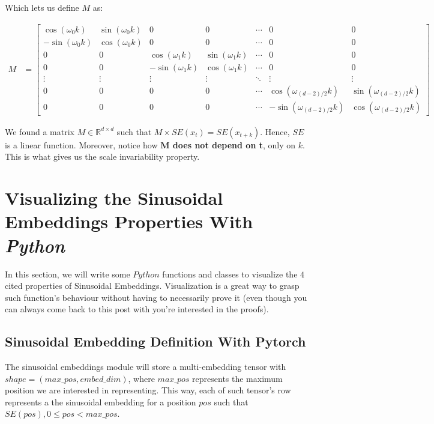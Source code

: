 \documentclass{article}
\begin{document}
Which lets us define $M$ as:

\begin{align}
	M &=
	\begin{bmatrix}
		\cos(\omega_0 k) & \sin(\omega_0 k) & 0 & 0 & \cdots & 0 & 0 \\
		-\sin(\omega_0 k) & \cos(\omega_0 k) & 0 & 0 & \cdots & 0 & 0 \\
		0 & 0 & \cos(\omega_1 k) & \sin(\omega_1 k) & \cdots & 0 & 0 \\
		0 & 0 & -\sin(\omega_1 k) & \cos(\omega_1 k) & \cdots & 0 & 0 \\
		\vdots & \vdots & \vdots & \vdots & \ddots & \vdots & \vdots \\
		0 & 0 & 0 & 0 & \cdots & \cos(\omega_{(d-2)/2} k) & \sin(\omega_{(d-2)/2} k) \\
		0 & 0 & 0 & 0 & \cdots & -\sin(\omega_{(d-2)/2} k) & \cos(\omega_{(d-2)/2} k)
	\end{bmatrix}
\end{align}



We found a matrix $M \in \mathbb{R}^{d \times d}$ such that $M \times  SE(x_{t}) = SE(x_{t + k}) $. Hence, $SE$ is a linear function. Moreover, notice how \textbf{M does not depend on t}, only on $k$. This is what gives us the scale invariability property.

\section{Visualizing the Sinusoidal Embeddings Properties With \textit{Python}}

In this section, we will write some $Python$ functions and classes to visualize the $4$ cited properties of Sinusoidal Embeddings. Visualization is a great way to grasp such function's behaviour without having to necessarily prove it (even though you can always come back to this post with you're interested in the proofs).

\subsection{Sinusoidal Embedding Definition With Pytorch}

The sinusoidal embeddings module will store a multi-embedding tensor with $shape =  (max\_pos, embed\_dim)$, where $max\_pos$ represents the maximum position we are interested in representing. This way, each of such tensor's row represents a the sinusoidal embedding for a position $pos$ such that $SE(pos), 0 \leq pos <  max\_pos $. 
\end{document}
